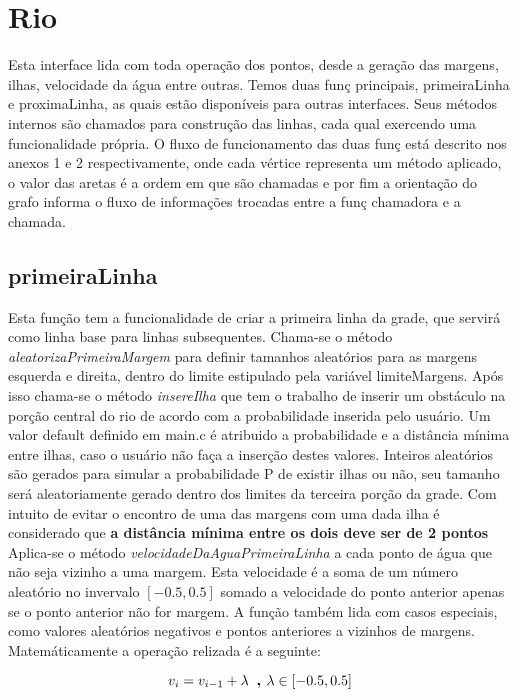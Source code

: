 \documentclass[a4paper,11pt]{article}
\begin{document}
\section{Rio}
Esta interface lida com toda opera\c{c}ão dos pontos, desde a gera\c{c}ão das margens, ilhas, velocidade da água entre outras. Temos duas fun\c{c} principais, primeiraLinha e proximaLinha, as quais estão disponíveis para outras interfaces. Seus métodos internos são chamados para constru\c{c}ão das linhas, cada qual exercendo uma funcionalidade própria. O fluxo de funcionamento das duas fun\c{c} está descrito nos anexos 1 e 2 respectivamente, onde cada vértice representa um método aplicado, o valor das aretas é a ordem em que são chamadas e por fim a orienta\c{c}ão do grafo informa o fluxo de informa\c{c}ões trocadas entre a fun\c{c} chamadora e a chamada.\\

\subsection{primeiraLinha}
Esta fun\c{c}ão tem a funcionalidade de criar a primeira linha da grade, que servirá como linha base para linhas subsequentes. Chama-se o método \textit{aleatorizaPrimeiraMargem} para definir tamanhos aleatórios para as margens esquerda e direita, dentro do limite estipulado pela variável limiteMargens. Após isso chama-se o método \textit{insereIlha} que tem o trabalho de inserir um obstáculo na por\c{c}ão central do rio de acordo com a probabilidade inserida pelo usuário. Um valor default definido em main.c é atribuido a probabilidade e a distância mínima entre ilhas, caso o usuário não fa\c{c}a a inser\c{c}ão destes valores. Inteiros aleatórios são gerados para simular a probabilidade P de existir ilhas ou não, seu tamanho será aleatoriamente gerado dentro dos limites da terceira por\c{c}ão da grade. Com intuito de evitar o encontro de uma das margens com uma dada ilha é considerado que \textbf{a distância mínima entre os dois deve ser de 2 pontos}
Aplica-se o método \textit{velocidadeDaAguaPrimeiraLinha} a cada ponto de água que não seja vizinho a uma margem. Esta velocidade é a soma de um número aleatório no invervalo $[-0.5,0.5]$ somado a velocidade do ponto anterior apenas se o ponto anterior não for margem. A fun\c{c}ão também lida com casos especiais, como valores aleatórios negativos e pontos anteriores a vizinhos de margens. Matemáticamente a opera\c{c}ão relizada é a seguinte:

\begin{equation}
v_i = v_{i-1} + \lambda \textbf{\, , } \lambda \in [-0.5,0.5]
\end{equation}
\end{document}
